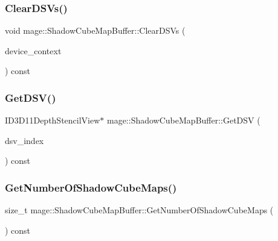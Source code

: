 \hypertarget{structmage_1_1_shadow_cube_map_buffer_a5ffb09d2ad4ee49497d8d374614950bb}{}\label{structmage_1_1_shadow_cube_map_buffer_a5ffb09d2ad4ee49497d8d374614950bb} 
\subsubsection{\texorpdfstring{Clear\+D\+S\+Vs()}{ClearDSVs()}}
{\footnotesize\ttfamily void mage\+::\+Shadow\+Cube\+Map\+Buffer\+::\+Clear\+D\+S\+Vs (\begin{DoxyParamCaption}\item[{I\+D3\+D11\+Device\+Context4 $\ast$}]{device\+\_\+context }\end{DoxyParamCaption}) const\hspace{0.3cm}{\ttfamily [noexcept]}}

\hypertarget{structmage_1_1_shadow_cube_map_buffer_a1db641015a14c177b4c504b85905060a}{}\label{structmage_1_1_shadow_cube_map_buffer_a1db641015a14c177b4c504b85905060a} 
\subsubsection{\texorpdfstring{Get\+D\+S\+V()}{GetDSV()}}
{\footnotesize\ttfamily I\+D3\+D11\+Depth\+Stencil\+View$\ast$ mage\+::\+Shadow\+Cube\+Map\+Buffer\+::\+Get\+D\+SV (\begin{DoxyParamCaption}\item[{size\+\_\+t}]{dsv\+\_\+index }\end{DoxyParamCaption}) const\hspace{0.3cm}{\ttfamily [noexcept]}}

\hypertarget{structmage_1_1_shadow_cube_map_buffer_ab6832adb714a9685972ece7c410b38ad}{}\label{structmage_1_1_shadow_cube_map_buffer_ab6832adb714a9685972ece7c410b38ad} 
\subsubsection{\texorpdfstring{Get\+Number\+Of\+Shadow\+Cube\+Maps()}{GetNumberOfShadowCubeMaps()}}
{\footnotesize\ttfamily size\+\_\+t mage\+::\+Shadow\+Cube\+Map\+Buffer\+::\+Get\+Number\+Of\+Shadow\+Cube\+Maps (\begin{DoxyParamCaption}{ }\end{DoxyParamCaption}) const\hspace{0.3cm}{\ttfamily [noexcept]}}

